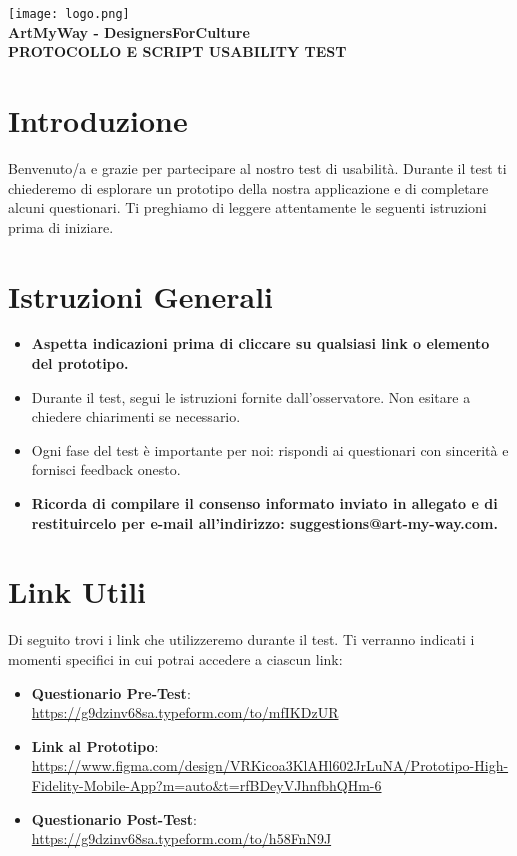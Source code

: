 \documentclass{article}
\begin{document}
\begin{center}
    \texttt{[image: logo.png]} \\[1em]
    {\LARGE \textbf{ArtMyWay - DesignersForCulture}} \\[0.5em]
    {\Large \textbf{PROTOCOLLO E SCRIPT USABILITY TEST}} \\[1.5em]
\end{center}

\section*{Introduzione}
Benvenuto/a e grazie per partecipare al nostro test di usabilit\`a. Durante il test ti chiederemo di esplorare un prototipo della nostra applicazione e di completare alcuni questionari.
Ti preghiamo di leggere attentamente le seguenti istruzioni prima di iniziare.

\section*{Istruzioni Generali}
\begin{itemize}
    \item \textbf{Aspetta indicazioni prima di cliccare su qualsiasi link o elemento del prototipo.}
    \item Durante il test, segui le istruzioni fornite dall'osservatore. Non esitare a chiedere chiarimenti se necessario.
    \item Ogni fase del test \`e importante per noi: rispondi ai questionari con sincerit\`a e fornisci feedback onesto.
    \item \textbf{Ricorda di compilare il consenso informato inviato in allegato e di restituircelo per e-mail all'indirizzo: suggestions@art-my-way.com.}
\end{itemize}

\section*{Link Utili}
Di seguito trovi i link che utilizzeremo durante il test. Ti verranno indicati i momenti specifici in cui potrai accedere a ciascun link:

\begin{itemize}
    \item \textbf{Questionario Pre-Test}: \\ \url{https://g9dzinv68sa.typeform.com/to/mfIKDzUR}
    \item \textbf{Link al Prototipo}: \\ \url{https://www.figma.com/design/VRKicoa3KlAHl602JrLuNA/Prototipo-High-Fidelity-Mobile-App?m=auto&t=rfBDeyVJhnfbhQHm-6}
    \item \textbf{Questionario Post-Test}: \\ \url{https://g9dzinv68sa.typeform.com/to/h58FnN9J}
\end{itemize}
\end{document}

